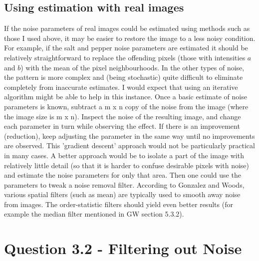 \documentclass{article}
\begin{document}
\subsection*{Using estimation with real images}
If the noise parameters of real images could be estimated using methods such as those I used above, it may be easier to restore the image to a less noisy condition. For example, if the salt and pepper noise parameters are estimated it should be relatively straightforward to replace the offending pixels (those with intensities $a$ and $b$) with the mean of the pixel neighbourhoods.
In the other types of noise, the pattern is more complex and (being stochastic) quite difficult to eliminate completely from inaccurate estimates. I would expect that using an iterative algorithm might be able to help in this instance. Once a basic estimate of noise parameters is known, subtract a m x n copy of the noise from the image (where the image size is m x n). Inspect the noise of the resulting image, and change each parameter in turn while observing the effect. If there is an improvement (reduction), keep adjusting the parameter in the same way until no improvements are observed. This 'gradient descent' approach would not be particularly practical in many cases.
A better approach would be to isolate a part of the image with relatively little detail (so that it is harder to confuse desirable pixels with noise) and estimate the noise parameters for only that area. Then one could use the parameters to tweak a noise removal filter.
 According to Gonzalez and Woods, various spatial filters  (such as mean) are typically used to smooth away noise from images. The order-statistic filters should yield even better results (for example the median filter mentioned in GW section 5.3.2).


\section*{Question 3.2 - Filtering out Noise}
\end{document}
